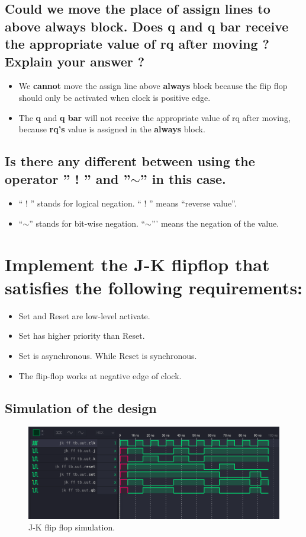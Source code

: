 \documentclass [12pt] {article}
\begin{document}
		\subsection{Could we move the place of assign lines to above always block. Does q and q bar receive the appropriate
value of rq after moving ? Explain your answer ?}
			\begin {itemize}
				\item We \textbf{cannot} move the assign line above \textbf{always} block because the flip flop should only be activated when clock is positive edge.
				\item The \textbf{q} and \textbf{q bar} will not receive the appropriate value of rq after moving, because \textbf{rq's} value is assigned in the \textbf{always} block.
			\end{itemize}
			
		\subsection{Is there any different between using the operator '' ! '' and ''$\sim$'' in this case.}
			\begin {itemize}
				\item `` ! '' stands for logical negation. `` ! '' means ``reverse value''.
 				\item ``$\sim$'' stands for bit-wise negation. ``$\sim$''' means the negation of the value.
			\end{itemize}

	\section {Implement the J-K flipflop that satisfies the following requirements:}
		\begin {itemize}
			\item Set and Reset are low-level activate. 
			\item Set has higher priority than Reset.
			\item Set is asynchronous. While Reset is synchronous.
			\item The flip-flop works at negative edge of clock.
		\end {itemize}
		
		\subsection {Simulation of the design}		
		\begin{figure}[htbp]
			\centerline{\includegraphics[scale = 0.5]{jkff.png}}
			\caption{J-K flip flop simulation.}
			\label{fig}
		\end{figure}
		
\end{document}
